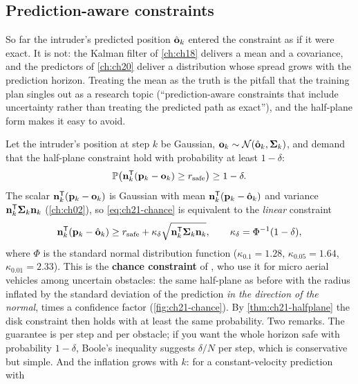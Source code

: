 \subsection{Prediction-aware constraints}
\label{sec:ch21-chance}

So far the intruder's predicted position $\hat{\mathbf{o}}_k$ entered the
constraint as if it were exact. It is not: the Kalman filter of \cref{ch:ch18}
delivers a mean and a covariance, and the predictors of \cref{ch:ch20} deliver
a distribution whose spread grows with the prediction horizon. Treating the
mean as the truth is the pitfall that the training plan singles out as a
research topic (``prediction-aware constraints that include uncertainty
rather than treating the predicted path as exact''), and the half-plane form
makes it easy to avoid.

Let the intruder's position at step $k$ be Gaussian,
$\mathbf{o}_k\sim\mathcal{N}(\hat{\mathbf{o}}_k,\mathbf{\Sigma}_k)$, and demand that the
half-plane constraint hold with probability at least $1-\delta$:
\begin{equation}
\mathbb{P}\bigl(\mathbf{n}_k^{\mathsf{T}}(\mathbf{p}_k-\mathbf{o}_k)\ge r_{\mathrm{safe}}\bigr)\ge1-\delta .
\label{eq:ch21-chance}
\end{equation}
The scalar $\mathbf{n}_k^{\mathsf{T}}(\mathbf{p}_k-\mathbf{o}_k)$ is Gaussian with mean
$\mathbf{n}_k^{\mathsf{T}}(\mathbf{p}_k-\hat{\mathbf{o}}_k)$ and variance
$\mathbf{n}_k^{\mathsf{T}}\mathbf{\Sigma}_k\mathbf{n}_k$ (\cref{ch:ch02}), so
\cref{eq:ch21-chance} is equivalent to the \emph{linear} constraint
\begin{equation}
\mathbf{n}_k^{\mathsf{T}}(\mathbf{p}_k-\hat{\mathbf{o}}_k)\ge r_{\mathrm{safe}}+\kappa_\delta\sqrt{\mathbf{n}_k^{\mathsf{T}}\mathbf{\Sigma}_k\mathbf{n}_k},
\qquad \kappa_\delta=\Phi^{-1}(1-\delta),
\label{eq:ch21-chance-linear}
\end{equation}
where $\Phi$ is the standard normal distribution function
($\kappa_{0.1}=1.28$, $\kappa_{0.05}=1.64$, $\kappa_{0.01}=2.33$). This is the
\textbf{chance constraint} of
\textcite{zhu2019chance}, who use it for micro aerial vehicles among
uncertain obstacles: the same half-plane as before with the radius inflated
by the standard deviation of the prediction \emph{in the direction of the
normal}, times a confidence factor (\cref{fig:ch21-chance}). By
\cref{thm:ch21-halfplane} the disk constraint then holds with at least the
same probability. Two remarks. The guarantee is per step and per obstacle; if
you want the whole horizon safe with probability $1-\delta$, Boole's
inequality suggests $\delta/N$ per step, which is conservative but simple.
And the inflation grows with $k$: for a constant-velocity prediction with
